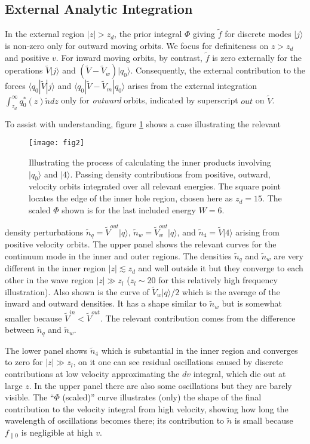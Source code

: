 \documentclass{jpp}
\def\ket#1{|#1\rangle}
\def\bra#1{\langle#1}
\begin{document}
\subsection{External Analytic Integration}

In the external region $|z|>z_d$, the prior integral $\Phi$ giving
$\tilde f$ for discrete modes $\ket{j}$ is non-zero only for outward
moving orbits. We focus for definiteness on $z>z_d$ and positive $v$.
For inward moving orbits, by contrast, $\tilde f$ is zero externally
for the operations $\tilde V\ket{j}$ and
$(\tilde V -\tilde V_w)\ket{q_0}$. Consequently, the external
contribution to the forces $\bra{q_0}|\tilde V \ket{j}$ and
$\bra{q_0}|\tilde V -\tilde V_m\ket{q_0}$ arises from the external
integration $\int_{z_d}^\infty q_0^*(z) \tilde n dz$ only for
\emph{outward} orbits, indicated by superscript $out$ on $\tilde V$.

To assist with understanding, figure \ref{externfig2} shows a case
illustrating the relevant
\begin{figure}
  \centering\texttt{[image: fig2]}
  \caption{Illustrating the process of calculating the inner products
    involving $\ket{q_0}$ and $\ket{4}$. Passing density contributions
    from positive, outward, velocity orbits integrated over all
    relevant energies. The square point locates the edge of the inner
    hole region, chosen here as $z_d=15$. The scaled $\Phi$ shown is
    for the last included energy $W=6$.\label{externfig2}}
\end{figure}
density perturbations $\tilde n_q=\tilde V^{out}\ket{q}$,
$\tilde n_w=\tilde V_w^{out}\ket{q}$, and $\tilde n_4=\tilde V\ket{4}$
arising from positive velocity orbits. The upper panel shows the
relevant curves for the continuum mode in the inner and outer regions.
The densities $\tilde n_q$ and $\tilde n_w$ are very different in the
inner region $|z|\lesssim z_d$ and well outside it but they converge to each
other in the wave region $|z|\gg z_l$ ($z_l\sim 20$ for this
relatively high frequency illustration). Also shown is the curve of
$\tilde V_w\ket{q}/2$ which is the average of the inward and
outward densities. It has a shape similar to $\tilde n_w$ but is
somewhat smaller because $\tilde V^{in}< \tilde V^{out}$. The
relevant contribution comes from the difference between $\tilde n_q$
and $\tilde n_w$. 

The lower panel shows $\tilde n_4$ which is substantial in the inner
region and converges to zero for $|z|\gg z_l$, on it one can see
residual oscillations caused by discrete contributions at low velocity
approximating the $dv$ integral, which die out at large $z$. In the
upper panel there are also some oscillations but they are barely
visible. The ``$\Phi$ (scaled)'' curve illustrates (only) the shape of
the final contribution to the velocity integral from high velocity,
showing how long the wavelength of oscillations becomes there; its
contribution to $\tilde n$ is small because $f_{\parallel0}$ is
negligible at high $v$.
\end{document}
